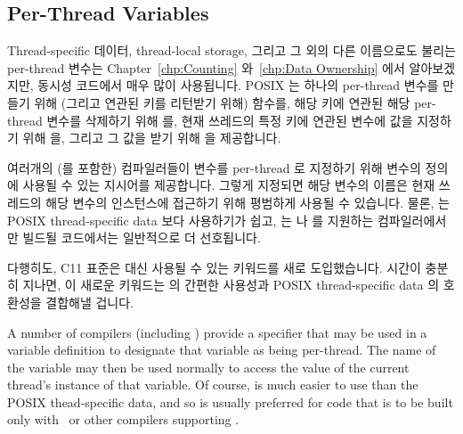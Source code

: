 \subsection{Per-Thread Variables}
\label{sec:toolsoftrade:Per-Thread Variables}

Thread-specific 데이터, thread-local storage, 그리고 그 외의 다른 이름으로도
불리는 per-thread 변수는 Chapter~\ref{chp:Counting} 와~\ref{chp:Data Ownership}
에서 알아보겠지만, 동시성 코드에서 매우 많이 사용됩니다.
POSIX 는 하나의 per-thread 변수를 만들기 위해 (그리고 연관된 키를 리턴받기
위해)  함수를, 해당 키에 연관된 해당 per-thread 변수를
삭제하기 위해  를, 현재 쓰레드의 특정 키에 연관된
변수에 값을 지정하기 위해  을, 그리고 그 값을 받기
위해  을 제공합니다.

여러개의 (\GCC 를 포함한) 컴파일러들이 변수를 per-thread 로 지정하기 위해
변수의 정의에 사용될 수 있는  지시어를 제공합니다.
그렇게 지정되면 해당 변수의 이름은 현재 쓰레드의 해당 변수의 인스턴스에
접근하기 위해 평범하게 사용될 수 있습니다.
물론,  는 POSIX thread-specific data 보다 사용하기가 쉽고,
 는 \GCC 나  를 지원하는 컴파일러에서만 빌드될
코드에서는 일반적으로 더 선호됩니다.

다행히도, C11 표준은  대신 사용될 수 있는 
키워드를 새로 도입했습니다.
시간이 충분히 지나면, 이 새로운 키워드는  의 간편한 사용성과 POSIX
thread-specific data 의 호환성을 결합해낼 겁니다.
\iffalse

A number of compilers (including \GCC) provide a  specifier
that may be used in a variable definition to designate that variable
as being per-thread.
The name of the variable may then be used normally to access the
value of the current thread's instance of that variable.
Of course,  is much easier to use than the POSIX
thead-specific data, and so  is usually preferred for
code that is to be built only with \GCC\ or other compilers supporting
.

